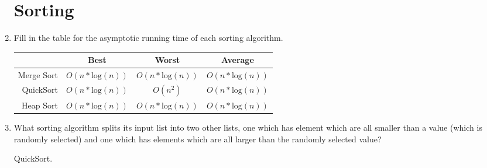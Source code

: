 \documentclass[11pt]{article}
\newenvironment{answer}{\large\lstset{basicstyle=\tiny\ttfamily}\color{white}}{}
\newenvironment{answer}{\large\lstset{basicstyle=\large\ttfamily}\color{red}}{}
\begin{document}
\begin{enumerate}
\section*{Sorting}

\item Fill in the table for the asymptotic running time of each sorting
      algorithm.
      \begin{center}
      \begin{tabular}{|r|c|c|c|}
        \hline
        ~ & Best & Worst & Average \\\hline
        Merge Sort &
            \begin{answer}$O(n*\textrm{log}(n))$\end{answer} &
            \begin{answer}$O(n*\textrm{log}(n))$\end{answer} &
            \begin{answer}$O(n*\textrm{log}(n))$\end{answer} \\\hline
        QuickSort &
            \begin{answer}$O(n*\textrm{log}(n))$\end{answer} &
            \begin{answer}$O(n^2)$\end{answer} &
            \begin{answer}$O(n*\textrm{log}(n))$\end{answer} \\\hline
        Heap Sort &
            \begin{answer}$O(n*\textrm{log}(n))$\end{answer} &
            \begin{answer}$O(n*\textrm{log}(n))$\end{answer} &
            \begin{answer}$O(n*\textrm{log}(n))$\end{answer} \\\hline
      \end{tabular}
      \end{center}

\item What sorting algorithm splits its input list into two other lists, one
      which has element which are all smaller than a value (which is randomly
      selected) and one which has elements which are all larger than the
      randomly selected value?

    \begin{answer}
    QuickSort.
    \end{answer}


\end{enumerate}
\end{document}
